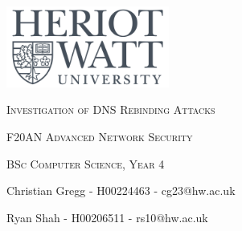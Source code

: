 \documentclass[11pt,a4paper]{report}
\begin{document}
	\begin{titlepage}
		\centering
		\vspace{4cm}
		\includegraphics[width=0.4\textwidth]{img/logo.png}\par
		\vspace{2cm}
		{\scshape\large Investigation of DNS Rebinding Attacks\par}
		\vspace{2cm}
		{\scshape\large F20AN Advanced Network Security\par}
		\vspace{0.5cm}
		{\scshape\large BSc Computer Science, Year 4\par}
		\vspace{2cm}

		\vfill
			{
				Christian Gregg - H00224463 - cg23@hw.ac.uk\par
				Ryan Shah - H00206511 - rs10@hw.ac.uk\par
			}
			\vspace{1cm}
		\vfill
	\end{titlepage}

	\tableofcontents

	\raggedright


	
	
\end{document}
